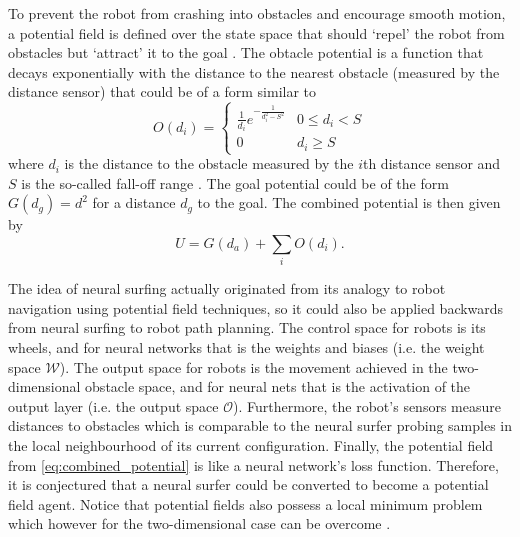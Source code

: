 To prevent the robot from crashing into obstacles and encourage smooth motion, a potential field is defined over the state space that should `repel' the robot from obstacles but `attract' it to the goal \cite[999--1000]{russell2010}.
The obtacle potential is a function that decays exponentially with the distance to the nearest obstacle (measured by the distance sensor) that could be of a form similar to
\begin{equation}
    O(d_i) = 
    \begin{cases} 
        \frac{1}{d_i} e^{-\frac{1}{d_i^2-S^2}} & 0 \leq d_i < S  \\
        0 & d_i \geq S
   \end{cases}
\end{equation}
where $d_i$ is the distance to the obstacle measured by the $i$th distance sensor and $S$ is the so-called fall-off range \cite{weir2006}.
The goal potential could be of the form
$G(d_g)=d^2$
for a distance $d_g$ to the goal. The combined potential is then given by
\begin{equation}
    \label{eq:combined_potential}
    U = G(d_a) + \sum_i{O(d_i)}.
\end{equation}

The idea of neural surfing actually originated from its analogy to robot navigation using potential field techniques, so it could also be applied backwards from neural surfing to robot path planning.
The control space for robots is its wheels, and for neural networks that is the weights and biases (i.e. the weight space $\mathcal{W}$).
The output space for robots is the movement achieved in the two-dimensional obstacle space, and for neural nets that is the activation of the output layer (i.e. the output space $\mathcal{O}$).
Furthermore, the robot's sensors measure distances to obstacles which is comparable to the neural surfer probing samples in the local neighbourhood of its current configuration.
Finally, the potential field from \ref{eq:combined_potential} is like a neural network's loss function.
Therefore, it is conjectured that a neural surfer could be converted to become a potential field agent.
Notice that potential fields also possess a local minimum problem which however for the two-dimensional case can be overcome \cite{weir2006}.